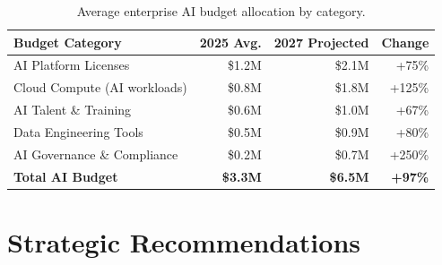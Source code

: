 \documentclass[
    language=english,
    doctype=market-analysis,
    institution=none,
]{../../omnilatex}
\begin{document}
\begin{table}[h]
    \centering
    \begin{tabular}{lrrr}
        \toprule
        \textbf{Budget Category} & \textbf{2025 Avg.} & \textbf{2027 Projected} & \textbf{Change} \\
        \midrule
        AI Platform Licenses      & \$1.2M  & \$2.1M  & +75\% \\
        Cloud Compute (AI workloads) & \$0.8M & \$1.8M & +125\% \\
        AI Talent \& Training     & \$0.6M  & \$1.0M  & +67\%  \\
        Data Engineering Tools    & \$0.5M  & \$0.9M  & +80\%  \\
        AI Governance \& Compliance & \$0.2M & \$0.7M & +250\% \\
        \midrule
        \textbf{Total AI Budget}  & \textbf{\$3.3M} & \textbf{\$6.5M} & \textbf{+97\%} \\
        \bottomrule
    \end{tabular}
    \caption{Average enterprise AI budget allocation by category.}
\end{table}

\section{Strategic Recommendations}
\end{document}
